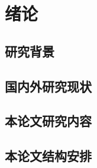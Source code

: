 
\chapter{绪论}
\label{cha:introduction}

\section{研究背景}
\label{sec:background}

\section{国内外研究现状}
\label{sec:related_works}

\section{本论文研究内容}
\label{sec:thesis_target}

\section{本论文结构安排}
\label{sec:thesis_structure}
